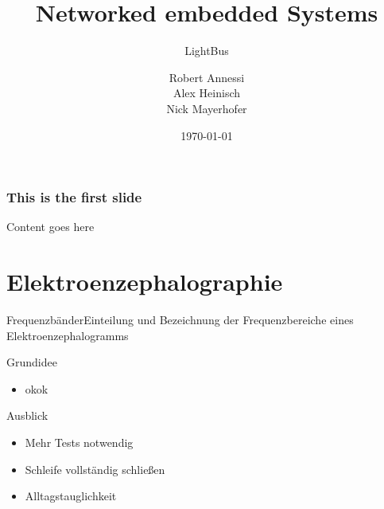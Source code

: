 \documentclass{beamer}
\title {Networked embedded Systems}
\subtitle {LightBus}
\author{Robert Annessi\\ Alex Heinisch\\ Nick Mayerhofer}
\date{\customdate\today}
\begin{document}
 \begin{frame}
    \frametitle{This is the first slide}
    Content goes here
  \end{frame}
\begin{frame}
  \titlepage
\end{frame}
 \logo{}



\section{Elektroenzephalographie}
\begin{frame}{Frequenzbänder}{Einteilung und Bezeichnung der Frequenzbereiche eines Elektroenzephalogramms}
\begin{center}
\end{center}
\end{frame}


\begin{frame}{Grundidee}
  \begin{itemize}
  \item \begin{large}okok\end{large}
  \end{itemize}
\end{frame}

\begin{frame}{Ausblick}
\begin{itemize}
 \item \begin{large}Mehr Tests notwendig\end{large}
 \item \begin{large}Schleife vollständig schließen\end{large}
 \item \begin{large}Alltagstauglichkeit\end{large}
\end{itemize}
\vspace{1cm}
\end{frame}
\end{document}
